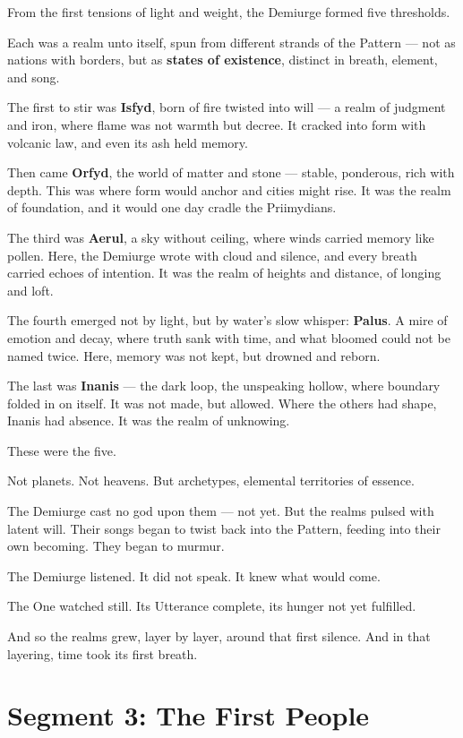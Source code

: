 \documentclass[11pt]{article}
\begin{document}
From the first tensions of light and weight, the Demiurge formed five thresholds.

Each was a realm unto itself, spun from different strands of the Pattern —  
not as nations with borders, but as \textbf{states of existence}, distinct in breath, element, and song.

The first to stir was \textbf{Isfyd}, born of fire twisted into will — a realm of judgment and iron, where flame was not warmth but decree.  
It cracked into form with volcanic law, and even its ash held memory.

Then came \textbf{Orfyd}, the world of matter and stone — stable, ponderous, rich with depth.  
This was where form would anchor and cities might rise.  
It was the realm of foundation, and it would one day cradle the Priimydians.

The third was \textbf{Aerul}, a sky without ceiling, where winds carried memory like pollen.  
Here, the Demiurge wrote with cloud and silence, and every breath carried echoes of intention.  
It was the realm of heights and distance, of longing and loft.

The fourth emerged not by light, but by water’s slow whisper: \textbf{Palus}.  
A mire of emotion and decay, where truth sank with time, and what bloomed could not be named twice.  
Here, memory was not kept, but drowned and reborn.

The last was \textbf{Inanis} — the dark loop, the unspeaking hollow, where boundary folded in on itself.  
It was not made, but allowed.  
Where the others had shape, Inanis had absence.  
It was the realm of unknowing.

These were the five.

Not planets. Not heavens.  
But archetypes, elemental territories of essence.

The Demiurge cast no god upon them — not yet.  
But the realms pulsed with latent will.  
Their songs began to twist back into the Pattern, feeding into their own becoming.  
They began to murmur.

The Demiurge listened. It did not speak.  
It knew what would come.

The One watched still.  
Its Utterance complete, its hunger not yet fulfilled.

And so the realms grew, layer by layer, around that first silence.  
And in that layering, time took its first breath.

\newpage

\section*{Segment 3: The First People}
\end{document}
